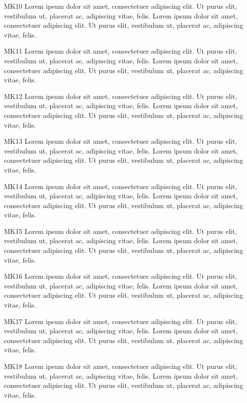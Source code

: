 \documentclass[twocolumn]{article}
\begin{document}
MK10 Lorem ipsum dolor sit amet, consectetuer adipiscing elit. Ut purus elit, vestibulum ut, placerat ac, adipiscing vitae, felis. Lorem ipsum dolor sit amet, consectetuer adipiscing elit. Ut purus elit, vestibulum ut, placerat ac, adipiscing vitae, felis.\par
{}MK11 Lorem ipsum dolor sit amet, consectetuer adipiscing elit. Ut purus elit, vestibulum ut, placerat ac, adipiscing vitae, felis. Lorem ipsum dolor sit amet, consectetuer adipiscing elit. Ut purus elit, vestibulum ut, placerat ac, adipiscing vitae, felis.\par
{}MK12 Lorem ipsum dolor sit amet, consectetuer adipiscing elit. Ut purus elit, vestibulum ut, placerat ac, adipiscing vitae, felis. Lorem ipsum dolor sit amet, consectetuer adipiscing elit. Ut purus elit, vestibulum ut, placerat ac, adipiscing vitae, felis.\par
{}MK13 Lorem ipsum dolor sit amet, consectetuer adipiscing elit. Ut purus elit, vestibulum ut, placerat ac, adipiscing vitae, felis. Lorem ipsum dolor sit amet, consectetuer adipiscing elit. Ut purus elit, vestibulum ut, placerat ac, adipiscing vitae, felis.\par
{}MK14 Lorem ipsum dolor sit amet, consectetuer adipiscing elit. Ut purus elit, vestibulum ut, placerat ac, adipiscing vitae, felis. Lorem ipsum dolor sit amet, consectetuer adipiscing elit. Ut purus elit, vestibulum ut, placerat ac, adipiscing vitae, felis.\par
{}MK15 Lorem ipsum dolor sit amet, consectetuer adipiscing elit. Ut purus elit, vestibulum ut, placerat ac, adipiscing vitae, felis. Lorem ipsum dolor sit amet, consectetuer adipiscing elit. Ut purus elit, vestibulum ut, placerat ac, adipiscing vitae, felis.\par
{}MK16 Lorem ipsum dolor sit amet, consectetuer adipiscing elit. Ut purus elit, vestibulum ut, placerat ac, adipiscing vitae, felis. Lorem ipsum dolor sit amet, consectetuer adipiscing elit. Ut purus elit, vestibulum ut, placerat ac, adipiscing vitae, felis.\par
{}MK17 Lorem ipsum dolor sit amet, consectetuer adipiscing elit. Ut purus elit, vestibulum ut, placerat ac, adipiscing vitae, felis. Lorem ipsum dolor sit amet, consectetuer adipiscing elit. Ut purus elit, vestibulum ut, placerat ac, adipiscing vitae, felis.\par
{}MK18 Lorem ipsum dolor sit amet, consectetuer adipiscing elit. Ut purus elit, vestibulum ut, placerat ac, adipiscing vitae, felis. Lorem ipsum dolor sit amet, consectetuer adipiscing elit. Ut purus elit, vestibulum ut, placerat ac, adipiscing vitae, felis.\par
\end{document}
